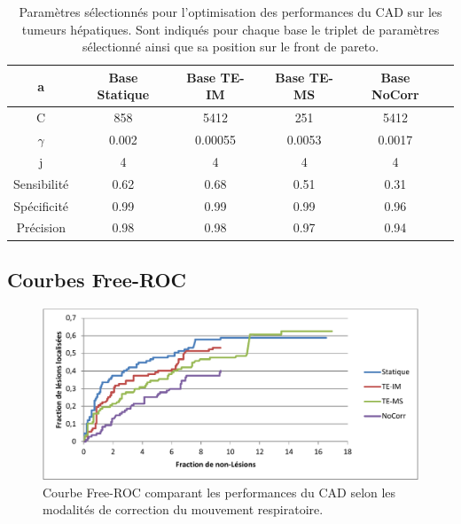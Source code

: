 \begin{table}[h!]
\begin{center}
		\begin{tabular}{c| c c c c c}
  \hline
  a	& Base Statique	& Base TE-IM	& Base TE-MS	& Base NoCorr	\\
  \hline
 C 	& 858		& 5412		& 251		& 5412		\\
\hline
$\gamma$& 0.002		& 0.00055	& 0.0053	& 0.0017	\\
\hline
j	& 4		& 4		& 4		& 4		\\
\hline
\hline
Sensibilité& 0.62	& 0.68		& 0.51		& 0.31	\\
\hline
Spécificité& 0.99	& 0.99		& 0.99		& 0.96		\\
\hline
Précision& 0.98		& 0.98		& 0.97		& 0.94		\\
\hline
 		\end{tabular}

\end{center}
\caption{Paramètres sélectionnés pour l'optimisation des performances du CAD sur les tumeurs hépatiques. Sont indiqués pour chaque base le triplet de paramètres sélectionné ainsi que sa position sur le front de pareto.}
\label{fig:paramsModFoie}
\end{table}

\subsection{Courbes Free-ROC}

\begin{figure}[h!]
 \begin{center}
   \includegraphics[width=15cm]{images/FROC_mod19}
   \vspace{-0.3cm}
 \end{center}
 \caption{Courbe Free-ROC comparant les performances du CAD selon les modalités de correction du mouvement respiratoire.}
\label{fig:froc_mod19}
\end{figure}


